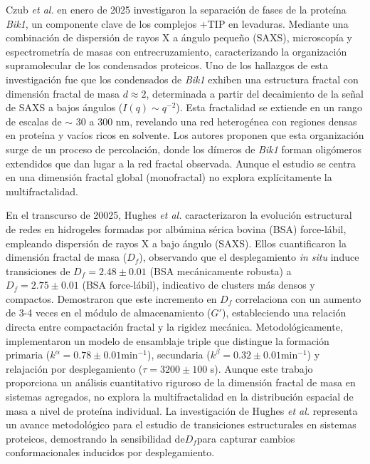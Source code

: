 Czub \textit{et al.} en enero de 2025 \cite{Czub2025} investigaron la separación de fases de la proteína \textit{Bik1}, un componente clave de los complejos +TIP en levaduras. Mediante una combinación de dispersión de rayos X a ángulo pequeño (SAXS), microscopía y espectrometría de masas con entrecruzamiento, caracterizando la organización supramolecular de los condensados proteicos. Uno de los hallazgos de esta investigación fue que los condensados de \textit{Bik1} exhiben una estructura fractal con dimensión fractal de masa $d \approx 2$, determinada a partir del decaimiento de la señal de SAXS a bajos ángulos ($I(q) \sim q^{-2}$). Esta fractalidad se extiende en un rango de escalas de $\sim$ 30 a 300 nm, revelando una red heterogénea con regiones densas en proteína y vacíos ricos en solvente. Los autores proponen que esta organización surge de un proceso de percolación, donde los dímeros de \textit{Bik1} forman oligómeros extendidos que dan lugar a la red fractal observada. Aunque el estudio se centra en una dimensión fractal global (monofractal) no explora explícitamente la multifractalidad.

En el transcurso de 20025, Hughes \textit{et al.} \cite{Hughes2025} caracterizaron la evolución estructural de redes en hidrogeles formadas por albúmina sérica bovina (BSA) force-lábil, empleando dispersión de rayos X a bajo ángulo (SAXS). Ellos cuantificaron la dimensión fractal de masa ($D_f$), observando que el desplegamiento \textit{in situ} induce transiciones de $D_f = 2.48 \pm 0.01$ (BSA mecánicamente robusta) a $D_f = 2.75 \pm 0.01$ (BSA force-lábil), indicativo de clusters más densos y compactos. Demostraron que este incremento en $D_f$ correlaciona con un aumento de 3-4 veces en el módulo de almacenamiento ($G'$), estableciendo una relación directa entre compactación fractal y la rigidez mecánica. Metodológicamente, implementaron un modelo de ensamblaje triple que distingue la formación primaria ($k^\alpha = 0.78 \pm 0.01 $min$^{-1}$), secundaria ($k^\beta = 0.32 \pm 0.01 $min$^{-1}$) y relajación por desplegamiento ($\tau = 3200 \pm 100$ s). Aunque este trabajo proporciona un análisis cuantitativo riguroso de la dimensión fractal de masa en sistemas agregados, no explora la multifractalidad en la distribución espacial de masa a nivel de proteína individual. La investigación de Hughes \textit{et al.} representa un avance metodológico para el estudio de transiciones estructurales en sistemas proteicos, demostrando la sensibilidad de$D_f$para capturar cambios conformacionales inducidos por desplegamiento.

